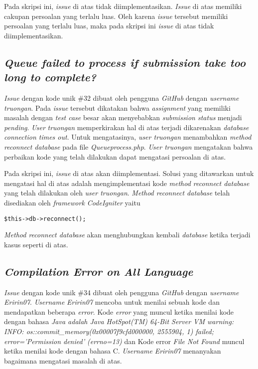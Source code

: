 Pada skripsi ini, \textit{issue} di atas tidak diimplementasikan. \textit{Issue} di atas memiliki cakupan persoalan yang terlalu luas. Oleh karena \textit{issue} tersebut memiliki persoalan yang terlalu luas, maka pada skripsi ini \textit{issue} di atas tidak diimplementasikan.
	
\subsection{\textit{Queue failed to process if submission take too long to complete?}}
\textit{Issue} dengan kode unik \#32 dibuat oleh pengguna \textit{GitHub} dengan \textit{username} \textit{truongan}. Pada \textit{issue} tersebut dikatakan bahwa \textit{assignment} yang memiliki masalah dengan \textit{test case} besar akan menyebabkan \textit{submission status} menjadi \textit{pending}. \textit{User} \textit{truongan} memperkirakan hal di atas terjadi dikarenakan \textit{database connection times out}. Untuk mengatasinya, \textit{user truongan} menambahkan \textit{method reconnect database} pada file \textit{Queueprocess.php}. \textit{User truongan} mengatakan bahwa perbaikan kode yang telah dilakukan dapat mengatasi persoalan di atas.

Pada skripsi ini, \textit{issue} di atas akan diimplementasi. Solusi yang ditawarkan untuk mengatasi hal di atas adalah mengimplementasi kode \textit{method reconnect database} yang telah dilakukan oleh \textit{user truongan}. \textit{Method reconnect database} telah disediakan oleh \textit{framework CodeIgniter} yaitu 
\begin{lstlisting}[basicstyle=\ttfamily, frame=single,
columns=fullflexible, keepspaces=true, breaklines=true]
$this->db->reconnect();
\end{lstlisting}
\textit{Method reconnect database} akan menghubungkan kembali \textit{database} ketika terjadi kasus seperti di atas.

\subsection{\textit{Compilation Error on All Language}}
\textit{Issue} dengan kode unik \#34 dibuat oleh pengguna \textit{GitHub} dengan \textit{username} \textit{Eririn07}. \textit{Username} \textit{Eririn07} mencoba untuk menilai sebuah kode dan mendapatkan beberapa \textit{error}. Kode \textit{error} yang muncul ketika menilai kode dengan bahasa \textit{Java adalah Java HotSpot(TM) 64-Bit Server VM warning: INFO: os::commit\_memory(0x00007f9cfd000000, 2555904, 1) failed; error='Permission denied' (errno=13)} dan Kode error \textit{File Not Found} muncul ketika menilai kode dengan bahasa C. \textit{Username} \textit{Eririn07} menanyakan bagaimana mengatasi masalah di atas.

